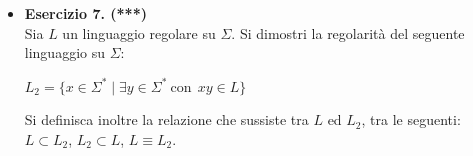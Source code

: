 \documentclass[a4paper,10pt]{article}
\newcommand{\EsercitazioneNum}{01}
\newcommand{\Data}{25/09/2025}
\begin{document}
{\begin{itemize}[label=, leftmargin=0pt]
\vfill
\noindent\makebox[\linewidth]{\rule{\linewidth}{0.4pt}}

    \newpage
    {\noindent
    \small \textbf{Computabilità, Complessità e Logica - a.a. 2025/26} \hfill \textbf{Esercitazione \EsercitazioneNum} \\[0.2cm]
    \scriptsize Matteo Liotta, \texttt{matteo.liotta@studenti.units.it} \hfill \Data \\[0.2cm]
    \noindent\makebox[\linewidth]{\rule{\linewidth}{0.4pt}} \\[0.3cm]}




    \item \textbf{Esercizio 7. (***)}\\ Sia $L$ un linguaggio regolare su $\Sigma$. Si dimostri la regolarità del seguente linguaggio su $\Sigma$:
    {\begin{center}
        $L_{2} = \{x\in \Sigma^*\mid \exists y\in\Sigma^*\ \text{con}\ \ xy\in L \}$
    \end{center}} 
    Si definisca inoltre la relazione che sussiste tra $L$ ed $L_2$, tra le seguenti: $L\subset L_2$, $L_2 \subset L$, $L\equiv L_2$.
    
    

\end{itemize}
}
\vfill
\noindent\makebox[\linewidth]{\rule{\linewidth}{0.1pt}}
\end{document}
